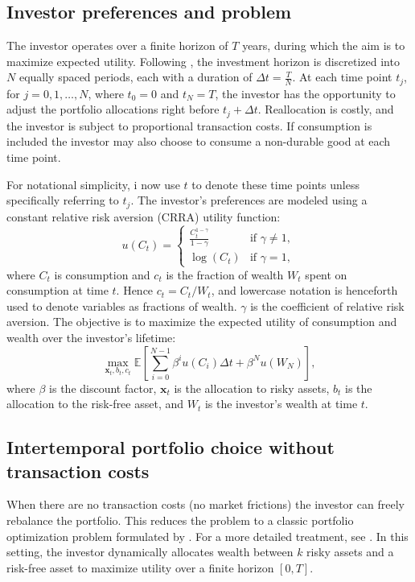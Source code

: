 \documentclass[11pt]{article}
\begin{document}
\subsection{Investor preferences and problem} \label{Subsection: Investor-Preferences}
The investor operates over a finite horizon of \(T\) years, during which the aim is to maximize expected utility. 
Following \textcite{CaiJuddXu2013}, the investment horizon is discretized into \(N\) equally spaced periods, 
each with a duration of \(\Delta t = \frac{T}{N}\). 
At each time point \(t_j\), for \(j = 0, 1, \dots, N\), where \(t_0 = 0\) and \(t_N = T\), 
the investor has the opportunity to adjust the portfolio allocations right before \(t_j + \Delta t\). 
Reallocation is costly, and the investor is subject to proportional transaction costs. 
If consumption is included the investor may also choose to consume a non-durable good at each time point.

For notational simplicity, i now use \(t\) to denote these time points unless specifically referring to \(t_j\). 
The investor's preferences are modeled using a constant relative risk aversion (CRRA) utility function:
\begin{equation}\label{eq:CRRA_Utility}
    u(C_t) = \begin{cases}
                \frac{C_t^{1-\gamma}}{1-\gamma} & \text{if } \gamma \neq 1, \\
                \log(C_t) & \text{if } \gamma = 1,
              \end{cases}
\end{equation}
where \(C_t\) is consumption and \(c_t\) is the fraction of wealth $W_t$ spent on consumption at time \(t\). Hence $c_t = C_t / W_t$,
and lowercase notation is henceforth used to denote variables as fractions of wealth. 
\(\gamma\) is the coefficient of relative risk aversion. 
The objective is to maximize the expected utility of consumption and wealth over the investor's lifetime:
\begin{equation}
  \label{eq:Expected_Utility}
  \max_{\mathbf{x}_t, b_t, c_t} \mathbb{E} \left[ \sum^{N-1}_{i=0} \beta^{i} u(C_i) \Delta t + \beta^N u(W_N) \right],
\end{equation}
where \(\beta\) is the discount factor, \(\mathbf{x}_t\) is the allocation to risky assets, \(b_t\) is the allocation to the risk-free asset, and \(W_t\) is the investor's wealth at time \(t\).


\subsection{Intertemporal portfolio choice without transaction costs} \label{Subsection: Intertemporal-Portfolio-Choice}
When there are no transaction costs (no market frictions) the investor can freely rebalance the portfolio.
This reduces the problem to a classic portfolio optimization problem formulated by \textcite{Merton1969, Merton1971}.
For a more detailed treatment, see \textcite{Bjork}. 
In this setting, the investor dynamically allocates wealth between \(k\) risky assets and a risk-free asset to maximize utility over a finite horizon \([0,T]\).
\end{document}
